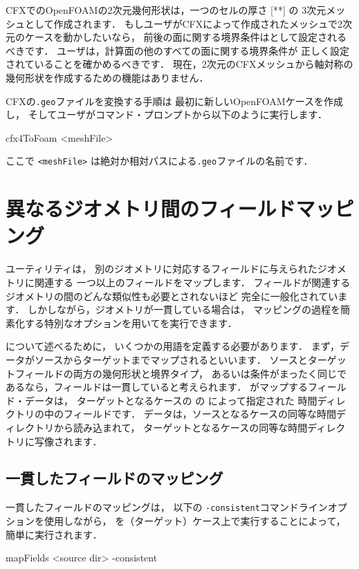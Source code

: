 CFXでのOpenFOAMの2次元幾何形状は，一つのセルの厚さ [**] の
3次元メッシュとして作成されます．
もしユーザがCFXによって作成されたメッシュで2次元のケースを動かしたいなら，
前後の面に関する境界条件はとして設定されるべきです．
ユーザは，計算面の他のすべての面に関する境界条件が
正しく設定されていることを確かめるべきです．
現在，2次元のCFXメッシュから軸対称の幾何形状を作成するための機能はありません．

CFXの\texttt{.geo}ファイルを変換する手順は
最初に新しいOpenFOAMケースを作成し，
そしてユーザがコマンド・プロンプトから以下のように実行します．
\begin{OFverbatim}[terminal]
cfx4ToFoam <meshFile>
\end{OFverbatim}
ここで \texttt{<meshFile>} は絶対か相対パスによる\texttt{.geo}ファイルの名前です．



\section{異なるジオメトリ間のフィールドマッピング}
\label{sec:5.6}
%
%
ユーティリティは，
別のジオメトリに対応するフィールドに与えられたジオメトリに関連する
一つ以上のフィールドをマップします．
フィールドが関連するジオメトリの間のどんな類似性も必要とされないほど
完全に一般化されています．
しかしながら，ジオメトリが一貫している場合は，
マッピングの過程を簡素化する特別なオプションを用いてを実行できます．

について述べるために，
いくつかの用語を定義する必要があります．
まず，データがソースからターゲットまでマップされるといいます．
ソースとターゲットフィールドの両方の幾何形状と境界タイプ，
あるいは条件がまったく同じであるなら，フィールドは一貫していると考えられます．
がマップするフィールド・データは，
ターゲットとなるケースの
%
%
の
によって指定された
時間ディレクトリの中のフィールドです．
データは，ソースとなるケースの同等な時間ディレクトリから読み込まれて，
ターゲットとなるケースの同等な時間ディレクトリに写像されます．


\subsection{一貫したフィールドのマッピング}
\label{ssec:5.6.1}
一貫したフィールドのマッピングは，
以下の \texttt{-consistent}コマンドラインオプションを使用しながら，
%
%
を（ターゲット）ケース上で実行することによって，
簡単に実行されます．
\begin{OFverbatim}[terminal]
mapFields <source dir> -consistent
\end{OFverbatim}

